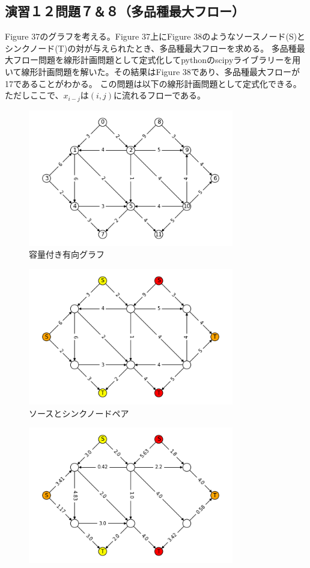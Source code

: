 \documentclass{report}
\begin{document}
\begin{CJK}{UTF8}{min}
    \section*{演習１２問題７＆８（多品種最大フロー）}
    Figure 37のグラフを考える。Figure 37上にFigure 38のようなソースノード(S)とシンクノード(T)の対が与えられたとき、多品種最大フローを求める。
    多品種最大フロー問題を線形計画問題として定式化してpythonのscipyライブラリーを用いて線形計画問題を解いた。その結果はFigure 38であり、多品種最大フローが17であることがわかる。
    この問題は以下の線形計画問題として定式化できる。ただしここで、$x_{i-j}$は$(i,j)$に流れるフローである。
    \begin{figure}[!h]
        \centerline{\includegraphics[width=0.8\textwidth]{data/ex12-MC-base.png}}
        \caption{容量付き有向グラフ}
    \end{figure}
    \begin{figure}[!h]
        \centerline{\includegraphics[width=0.8\textwidth]{data/ex12-MC-start.png}}
        \caption{ソースとシンクノードペア}
    \end{figure}
    \begin{figure}[!h]
        \centerline{\includegraphics[width=0.8\textwidth]{data/ex12-MC-result.png}}

\end{figure}
\end{CJK}
\end{document}
